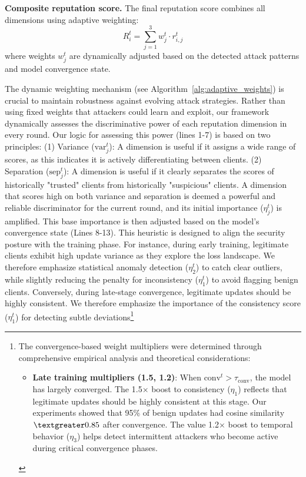 \documentclass[lettersize,journal]{IEEEtran}
\begin{document}
{\textbf{Composite reputation score.} The final reputation score combines all dimensions using adaptive weighting:
\begin{equation}
R_i^t = \sum_{j=1}^{3} w_j^t \cdot r_{i,j}^t
\end{equation}
where weights $w_j^t$ are dynamically adjusted based on the detected attack patterns and model convergence state.


The dynamic weighting mechanism (see Algorithm~\ref{alg:adaptive_weights}) is crucial to maintain robustness against evolving attack strategies. Rather than using fixed weights that attackers could learn and exploit, our framework dynamically assesses the discriminative power of each reputation dimension in every round.
Our logic for assessing this power (lines 1-7) is based on two principles: (1) Variance ($\text{var}_j^t$): A dimension is useful if it assigns a wide range of scores, as this indicates it is actively differentiating between clients. (2) Separation ($\text{sep}_j^t$): A dimension is useful if it clearly separates the scores of historically "trusted" clients from historically "suspicious" clients. A dimension that scores high on both variance and separation is deemed a powerful and reliable discriminator for the current round, and its initial importance ($\eta_j^t$) is amplified.
This base importance is then adjusted based on the model's convergence state (Lines 8-13). This heuristic is designed to align the security posture with the training phase. For instance, during early training, legitimate clients exhibit high update variance as they explore the loss landscape. We therefore emphasize statistical anomaly detection ($\eta_2^t$) to catch clear outliers, while slightly reducing the penalty for inconsistency ($\eta_1^t$) to avoid flagging benign clients. Conversely, during late-stage convergence, legitimate updates should be highly consistent. We therefore emphasize the importance of the consistency score ($\eta_1^t$) for detecting subtle deviations\footnote{\scriptsize The convergence-based weight multipliers were determined through comprehensive empirical analysis and theoretical considerations:
\begin{itemize}[noitemsep,topsep=0pt,wide]
\item \textbf{Late training multipliers (1.5, 1.2)}: When $\text{conv}^t > \tau_{\text{conv}}$, the model has largely converged. The 1.5$\times$ boost to consistency ($\eta_1$) reflects that legitimate updates should be highly consistent at this stage. Our experiments showed that 95\% of benign updates had cosine similarity $\textgreater 0.85$ after convergence. The value 1.2$\times$ boost to temporal behavior ($\eta_3$) helps detect intermittent attackers who become active during critical convergence phases.

\end{itemize}}}
\end{document}
